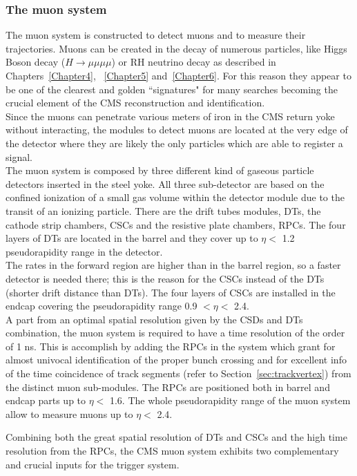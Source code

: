 \subsubsection{The muon system}\label{sec:muonsystem}
The muon system is constructed to detect muons and to measure their
trajectories. Muons can be created in the decay of numerous particles,
like Higgs Boson decay ($H \rightarrow \mu \mu \mu \mu$) or 
RH neutrino decay as described in
Chapters~\ref{Chapter4}, ~\ref{Chapter5} and~\ref{Chapter6}. For this
reason they
appear to be one of the clearest and golden ``signatures" for many
searches becoming the crucial element of the CMS reconstruction
and identification.\\
Since the muons can penetrate various meters of iron in the CMS return
yoke without interacting, the modules to detect muons are located at
the very edge of the detector where they are likely the only particles
which are able to register a signal.\\
The muon system is composed by three different kind of gaseous particle
detectors inserted in the steel yoke. All three sub-detector are
based on the confined ionization of a small gas volume within the detector
module due to the transit of an ionizing particle.
There are the drift tubes
modules, DTs, the cathode strip chambers, CSCs and the resistive plate
chambers, RPCs.
The four layers of DTs are located in the barrel and they cover up to
$\eta<$ 1.2 pseudorapidity range in the detector. \\
The rates in the forward region are higher than in the
barrel region, so a faster detector is needed there; this is the
reason for the CSCs instead of the DTs (shorter drift distance than DTs).
The four layers of
CSCs are installed in the endcap covering the pseudorapidity range 0.9
$<\eta<$ 2.4. \\
A part from an optimal spatial resolution given by the CSDs and DTs
combination, the muon system is required to have a time resolution of
the order of 1 ns. This is accomplish by adding the RPCs in the system
which grant for almost univocal identification of the proper bunch
crossing and for excellent info of the time coincidence of track
segments (refer to Section~\ref{sec:trackvertex}) from the distinct
muon sub-modules. 
The RPCs are positioned both in barrel
and endcap parts up to $\eta<$ 1.6. The whole pseudorapidity range of
the muon system allow to measure muons up to $\eta<$ 2.4.

Combining both the great spatial resolution of DTs and CSCs and the
high time resolution from the RPCs,
 the CMS muon system exhibits two
complementary and crucial inputs for the trigger system. 




